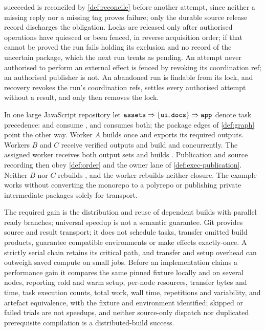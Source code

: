 \begin{definition}
succeeded is reconciled by \cref{def:reconcile} before another attempt, since
neither a missing reply nor a missing tag proves failure; only the durable
source release record discharges the obligation. Locks are released only after
authorised operations have quiesced or been fenced, in reverse acquisition
order; if that cannot be proved the run fails holding its exclusion and no
record of the uncertain package, which the next run treats as pending. An
attempt never authorised to perform an external effect is fenced by revoking
its coordination ref; an authorised publisher is not. An abandoned run is
findable from its lock, and recovery revokes the run's coordination refs,
settles every authorised attempt without a result, and only then removes the
lock.
\end{definition}

\begin{example}
\label{ex:exec-required}
In one large JavaScript repository let $\texttt{assets} \Rightarrow \{\texttt{ui},
\texttt{docs}\} \Rightarrow \texttt{app}$ denote task precedence:  and
 consume , and  consumes both; the package
edges of \cref{def:graph} point the other way. Worker $A$ builds 
once and exports its required outputs. Workers $B$ and $C$ receive verified
outputs and build  and  concurrently. The assigned
 worker receives both output sets and builds .
Publication and source recording then obey \cref{def:order} and the owner
lane of \cref{def:exec-publication}. Neither $B$ nor $C$ rebuilds
, and the  worker rebuilds neither closure. The
example works without converting the monorepo to a polyrepo or publishing
private intermediate packages solely for transport.
\end{example}

\begin{remark}
\label{rem:exec-boundary}
The required gain is the distribution and reuse of dependent builds with
parallel ready branches; universal speedup is not a semantic guarantee. Git
provides source and result transport; it does not schedule tasks, transfer
omitted build products, guarantee compatible environments or make effects
exactly-once. A strictly serial chain retains its critical path, and transfer
and setup overhead can outweigh saved compute on small jobs. Before an
implementation claims a performance gain it compares the same pinned fixture
locally and on several nodes, reporting cold and warm setup, per-node
resources, transfer bytes and time, task execution counts, total work, wall
time, repetitions and variability, and artefact equivalence, with the fixture
and environment identified; skipped or failed trials are not speedups, and
neither source-only dispatch nor duplicated prerequisite compilation is a
distributed-build success.
\end{remark}

